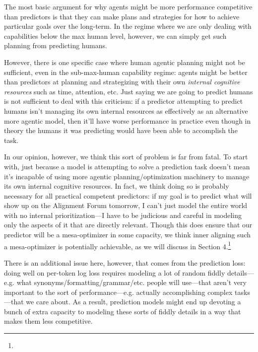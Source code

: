 {The most basic argument for why agents might be more performance competitive than predictors is that they can make plans and strategies for how to achieve particular goals over the long-term. In the regime where we are only dealing with capabilities below the max human level, however, we can simply get such planning from predicting humans.

However, there is one specific case where human agentic planning might not be sufficient, even in the sub-max-human capability regime: agents might be better than predictors at planning and strategizing with their own \textit{internal cognitive resources} such as time, attention, etc. Just saying we are going to predict humans is not sufficient to deal with this criticism: if a predictor attempting to predict humans isn't managing its own internal resources as effectively as an alternative more agentic model, then it'll have worse performance in practice even though in theory the humans it was predicting would have been able to accomplish the task.

In our opinion, however, we think this sort of problem is far from fatal. To start with, just because a model is attempting to solve a prediction task doesn't mean it's incapable of using more agentic planning/optimization machinery to manage its own internal cognitive resources. In fact, we think doing so is probably necessary for all practical competent predictors: if my goal is to predict what will show up on the Alignment Forum tomorrow, I can't just model the entire world with no internal prioritization---I have to be judicious and careful in modeling only the aspects of it that are directly relevant. Though this does ensure that our predictor will be a mesa-optimizer\cite{TODO: cite https://www.alignmentforum.org/s/r9tYkB2a8Fp4DN8yB} in some capacity, we think inner aligning such a mesa-optimizer is potentially achievable, as we will discuss in Section 4\cite{TODO: cite TODO}.\footnote{}

There is an additional issue here, however, that comes from the prediction loss: doing well on per-token log loss requires modeling a lot of random fiddly details---e.g. what synonyms/formatting/grammar/etc. people will use---that aren't very important to the sort of performance---e.g. actually accomplishing complex tasks---that we care about. As a result, prediction models might end up devoting a bunch of extra capacity to modeling these sorts of fiddly details in a way that makes them less competitive.

}
